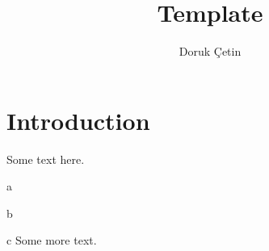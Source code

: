 \documentclass[12pt]{article}
\begin{document}
\rhead{\today}

\title{Template}
\author{Doruk Çetin}
\maketitle

\setcounter{tocdepth}{1}
\tableofcontents

\section{Introduction}
Some text here.
\ulb
\item a
\item b
\item c
\ule
Some more text.
\end{document}
